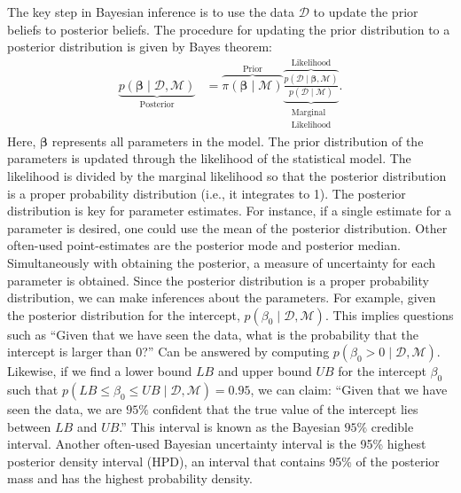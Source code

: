 \documentclass[a4paper]{article}
\newcommand{\prob}[1]{p\left(#1\right)}
\newcommand{\lik}[1]{p\left(#1\right)}
\newcommand{\data}{\mathcal{D}}
\newcommand{\model}{\mathcal{M}}
\newcommand{\prior}[1]{\pi\left(#1\right)}
\begin{document}
The key step in Bayesian inference is to use the data $\data$ to update the prior beliefs to posterior beliefs. The procedure for updating the prior distribution to a posterior distribution is given by Bayes theorem:
\begin{align*}\label{eq:BayesTheorem}
\underbrace{\prob{\bm{\beta} \mid \data , \model}}_{\text{Posterior}}
&=
\overbrace{\prior{\bm{\beta}\mid \model}}^{\text{Prior}}
\underbrace{\overbrace{
		\frac{\lik{\data \mid \bm{\beta}, \model}}{\prob{\data \mid \model}}
	}^{\text{Likelihood}}}_{\substack{\text{Marginal}\\ \text{Likelihood}}}.
\end{align*}
Here, $\bm{\beta}$ represents all parameters in the model. The prior distribution of the parameters is updated through the likelihood of the statistical model. The likelihood is divided by the marginal likelihood so that the posterior distribution is a proper probability distribution (i.e., it integrates to 1). The posterior distribution is key for parameter estimates. For instance, if a single estimate for a parameter is desired, one could use the mean of the posterior distribution. Other often-used point-estimates are the posterior mode and posterior median. Simultaneously with obtaining the posterior, a measure of uncertainty for each parameter is obtained. Since the posterior distribution is a proper probability distribution, we can make inferences about the parameters. For example, given the posterior distribution for the intercept, $\prob{\beta_0 \mid \data , \model}$. This implies questions such as ``Given that we have seen the data, what is the probability that the intercept is larger than 0?'' Can be answered by computing $\prob{\beta_0 > 0 \mid \data , \model}$. Likewise, if we find a lower bound $LB$ and upper bound $UB$ for the intercept $\beta_0$ such that $\prob{ LB \leq \beta_0 \leq UB \mid \data , \model} = 0.95$, we can claim: ``Given that we have seen the data, we are $95\%$ confident that the true value of the intercept lies between $LB$ and $UB$.'' This interval is known as the Bayesian $95\%$ credible interval. Another often-used Bayesian uncertainty interval is the 95\% highest posterior density interval (HPD), an interval that contains 95\% of the posterior mass and has the highest probability density.
\end{document}
